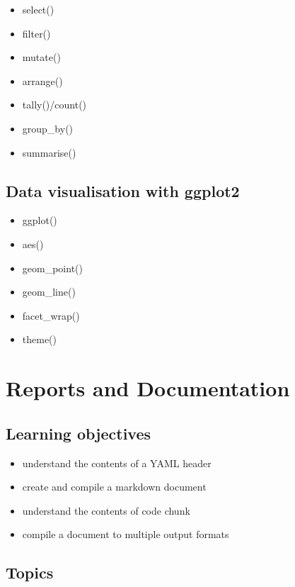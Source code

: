 \documentclass[]{book}
\providecommand{\tightlist}{%
  \setlength{\itemsep}{0pt}\setlength{\parskip}{0pt}}
\begin{document}
\begin{itemize}
\tightlist
\item
  select()
\item
  filter()
\item
  mutate()
\item
  arrange()
\item
  tally()/count()
\item
  group\_by()
\item
  summarise()
\end{itemize}

\hypertarget{data-visualisation-with-ggplot2}{%
\section{Data visualisation with
ggplot2}\label{data-visualisation-with-ggplot2}}

\begin{itemize}
\tightlist
\item
  ggplot()
\item
  aes()
\item
  geom\_point()
\item
  geom\_line()
\item
  facet\_wrap()
\item
  theme()
\end{itemize}

\hypertarget{reports-and-documentation}{%
\chapter{Reports and Documentation}\label{reports-and-documentation}}

\hypertarget{learning-objectives-1}{%
\section{Learning objectives}\label{learning-objectives-1}}

\begin{itemize}
\tightlist
\item
  understand the contents of a YAML header
\item
  create and compile a markdown document
\item
  understand the contents of code chunk
\item
  compile a document to multiple output formats
\end{itemize}

\hypertarget{topics}{%
\section{Topics}\label{topics}}
\end{document}
